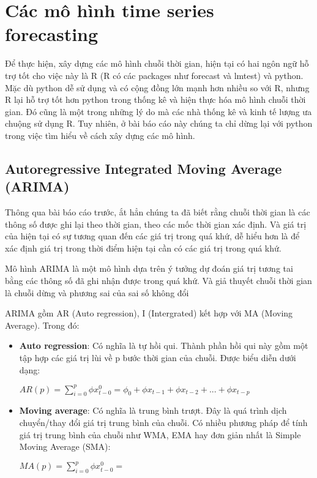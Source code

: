 \chapter{Các mô hình time series forecasting}

Để thực hiện, xây dựng các mô hình chuỗi thời gian, hiện tại có hai ngôn ngữ hỗ trợ tốt cho việc này là R (R có các packages như forecast và lmtest) và python. Mặc dù python dễ sử dụng và có cộng đồng lớn mạnh hơn nhiều so với R, nhưng R lại hỗ trợ tốt hơn python trong thống kê và hiện thực hóa mô hình chuỗi thời gian. Đó cũng là một trong những lý do mà các nhà thống kê và kinh tế lượng ưa chuộng sử dụng R. Tuy nhiên, ở bài báo cáo này chúng ta chỉ dừng lại với python trong việc tìm hiểu về cách xây dựng các mô hình.

\section{Autoregressive Integrated Moving Average (ARIMA)}

Thông qua bài báo cáo trước, ắt hẳn chúng ta đã biết rằng chuỗi thời gian là các thông số được ghi lại theo thời gian, theo các mốc thời gian xác định. Và giá trị của hiện tại có sự tương quan đến các giá trị trong quá khứ, dễ hiểu hơn là để xác định giá trị trong thời điểm hiện tại cần có các giá trị trong quá khứ.

\bigskip
Mô hình ARIMA là một mô hình dựa trên ý tưởng dự đoán giá trị tương tai bằng các thông số đã ghi nhận được trong quá khứ. Và giả thuyết chuỗi thời gian là chuỗi dừng và phương sai của sai số không đổi

\bigskip
ARIMA gồm AR (Auto regression), I (Intergrated) kết hợp với MA (Moving Average). Trong đó:

\begin{itemize}
	\item \textbf{Auto regression}: Có nghĩa là tự hồi qui. Thành phần hồi qui này gồm một tập hợp các giá trị lùi về p bước thời gian của chuỗi. Được biểu diễn dưới dạng:
	\begin{center}
		$ AR(p) = \sum_{i=0}^{p} \phi x^0_{t-0} = \phi_0  + \phi x_{t-1} + \phi x_{t-2} + ... + \phi x_{t-p}$
	\end{center}
	\item \textbf{Moving average}: Có nghĩa là trung bình trượt. Đây là quá trình dịch chuyển/thay đổi giá trị trung bình của chuỗi. Có nhiều phương pháp để tính giá trị trung bình của chuỗi như WMA, EMA hay đơn giản nhất là Simple Moving Average (SMA):
	\begin{center}
		$ MA(p) = \sum_{i=0}^{p} \phi x^0_{t-0} = $
	\end{center}
\end{itemize}


